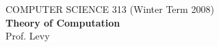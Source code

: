 \documentclass [12pt,psfig]{article}
\begin{document}
\renewcommand{\topfraction}{0.9}	%
\renewcommand{\bottomfraction}{0.8}	%
\setcounter{topnumber}{2}
\setcounter{bottomnumber}{2}
\setcounter{totalnumber}{4}     %
\setcounter{dbltopnumber}{2}    %
\renewcommand{\dbltopfraction}{0.9}	%
\renewcommand{\textfraction}{0.07}	%
\renewcommand{\floatpagefraction}{0.7}	%
\renewcommand{\dblfloatpagefraction}{0.7}	%



\begin{flushleft}
\begin{minipage}{1.25in}
\hspace{-0.5in}
\end{minipage}
\end{flushleft}

\vspace{-1.25in}

\begin{flushright}
\begin{minipage}{430pt}
{
\begin{flushleft}
{\Large C}{\large OMPUTER} 
{\Large S}{\large CIENCE}
{\Large 313} {\large (Winter Term 2008)\\
\textbf{Theory of Computation}}\\
Prof. Levy\hfill\\
\end{flushleft}
}
\end{minipage}
\end{flushright}
\end{document}
